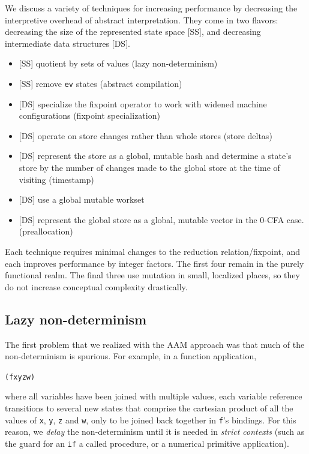 \documentclass[preprint,onecolumn,9pt]{sigplanconf} %
\begin{document}
We discuss a variety of techniques for increasing performance by
decreasing the interpretive overhead of abstract interpretation. They
come in two flavors: decreasing the size of the represented state
space [SS], and decreasing intermediate data structures [DS].

\begin{itemize}
 \item{[SS] quotient by sets of values (lazy non-determinism)}
 \item{[SS] remove {\tt ev} states (abstract compilation)}
 \item{[DS] specialize the fixpoint operator to work with widened
   machine configurations (fixpoint specialization)}
 \item{[DS] operate on store changes rather than whole stores (store deltas)}
 \item{[DS] represent the store as a global, mutable hash and
   determine a state's store by the number of changes made to the
   global store at the time of visiting (timestamp)}
 \item{[DS] use a global mutable workset}
 \item{[DS] represent the global store as a global, mutable vector in
   the 0-CFA case. (preallocation)}
\end{itemize}
Each technique requires minimal changes to the reduction
relation/fixpoint, and each improves performance by integer
factors. The first four remain in the purely functional realm. The
final three use mutation in small, localized places, so they do not
increase conceptual complexity drastically.

\subsection{Lazy non-determinism}

The first problem that we realized with the AAM approach was that much
of the non-determinism is spurious. For example, in a function
application,
\begin{alltt}
(f x y z w)
\end{alltt}
where all variables have been joined with multiple values, each
variable reference transitions to several new states that comprise the
cartesian product of all the values of {\tt x}, {\tt y}, {\tt z} and
{\tt w}, only to be joined back together in {\tt f}'s bindings. For
this reason, we {\it delay} the non-determinism until it is needed in
{\it strict contexts} (such as the guard for an {\tt if} a called
procedure, or a numerical primitive application).
\end{document}
